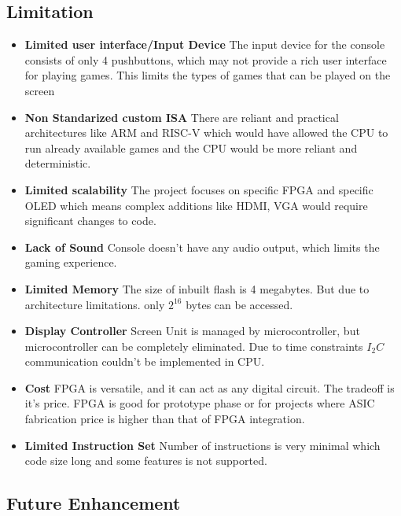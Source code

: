 \documentclass[a4paper,12pt]{article}
\begin{document}
    \subsection{Limitation}

    \begin{itemize}
        \item \textbf{Limited user interface/Input Device} The input device for the console consists of only 4 pushbuttons, which may not provide a rich user interface for playing games. This limits the types of games that can be played on the screen 
        \item \textbf{Non Standarized custom ISA} There are reliant and practical architectures like ARM and RISC-V which would have allowed the CPU to run already available games and the CPU would be more reliant and deterministic. 
        \item \textbf{Limited scalability} The project focuses on specific FPGA and specific OLED which means complex additions like HDMI, VGA would require significant changes to code.
        \item \textbf{Lack of Sound} Console doesn't have any audio output, which limits the gaming experience. 
        \item \textbf{Limited Memory} The size of inbuilt flash is 4 megabytes. But due to architecture limitations. only $2^{16}$ bytes can be accessed.
        \item \textbf{Display Controller} Screen Unit is managed by microcontroller, but microcontroller can be completely eliminated. Due to time constraints $I_2C$ communication couldn't be implemented in CPU. 
        \item \textbf{Cost} FPGA is versatile, and it can act as any digital circuit. The tradeoff is it's price. FPGA is good for prototype phase or for projects where ASIC fabrication price is higher than that of FPGA integration.
        \item \textbf{Limited Instruction Set} Number of instructions is very minimal which code size long and some features is not supported. 
    \end{itemize}

    
    \subsection{Future Enhancement}
\end{document}
